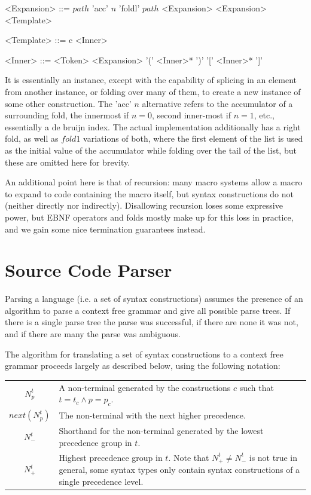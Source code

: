 \documentclass{kththesis}
\begin{document}
\setlength{\grammarindent}{8em}
\begin{grammar}
<Expansion> ::= $path$
  \alt 'acc' $n$
  \alt 'foldl' $path$ <Expansion> <Expansion>
  \alt <Template>

<Template> ::= c <Inner>

<Inner> ::= <Token>
  \alt <Expansion>
  \alt '(' <Inner>* ')'
  \alt '[' <Inner>* ']'
\end{grammar}

It is essentially an instance, except with the capability of splicing in an element from another instance, or folding over many of them, to create a new instance of some other construction. The 'acc' $n$ alternative refers to the accumulator of a surrounding fold, the innermost if $n = 0$, second inner-most if $n = 1$, etc., essentially a de bruijn index. The actual implementation additionally has a right fold, as well as $fold1$ variations of both, where the first element of the list is used as the initial value of the accumulator while folding over the tail of the list, but these are omitted here for brevity.

An additional point here is that of recursion: many macro systems allow a macro to expand to code containing the macro itself, but syntax constructions do not (neither directly nor indirectly). Disallowing recursion loses some expressive power, but EBNF operators and folds mostly make up for this loss in practice, and we gain some nice termination guarantees instead.

\section{Source Code Parser}

Parsing a language (i.e. a set of syntax constructions) assumes the presence of an algorithm to parse a context free grammar and give all possible parse trees. If there is a single parse tree the parse was successful, if there are none it was not, and if there are many the parse was ambiguous.

The algorithm for translating a set of syntax constructions to a context free grammar proceeds largely as described below, using the following notation:

\mathligsoff
{\tabulinesep=2mm
\begin{tabu}{c|p{10cm}}
$N^t_p$ & A non-terminal generated by the constructions $c$ such that $t = t_c \land p = p_c$. \\
$next(N^t_p)$ & The non-terminal with the next higher precedence. \\
$N^t_-$ & Shorthand for the non-terminal generated by the lowest precedence group in $t$. \\
$N^t_+$ & Highest precedence group in $t$. Note that $N^t_+ \neq N^t_-$ is not true in general, some syntax types only contain syntax constructions of a single precedence level. \\
\end{tabu}
}
\end{document}
